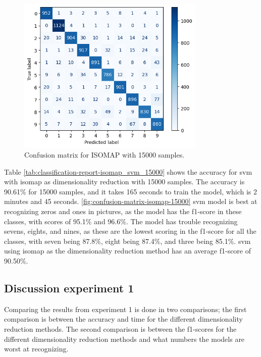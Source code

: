 \begin{figure}[htb!]
    \centering
    \includegraphics[width=0.8\textwidth]{figures/1-experiment/confusion_matrix_isomap_svm_15000.png}
    \caption{Confusion matrix for ISOMAP with 15000 samples.}
    \label{fig:confusion-matrix-isomap-15000}
\end{figure}


Table \ref{tab:classification-report-isomap_svm_15000} shows the accuracy for \gls{svm} with \gls{isomap} as dimensionality reduction with 15000 samples. The accuracy is 90.61\% for 15000 samples, and it takes 165 seconds to train the model, which is 2 minutes and 45 seconds. \autoref{fig:confusion-matrix-isomap-15000} \gls{svm} model is best at recognizing zeros and ones in pictures, as the model has the f1-score in these classes, with scores of 95.1\% and 96.6\%. The model has trouble recognizing sevens, eights, and nines, as these are the lowest scoring in the f1-score for all the classes, with seven being 87.8\%, eight being 87.4\%, and three being 85.1\%. \gls{svm} using \gls{isomap} as the dimensionality reduction method has an average f1-score of 90.50\%.

\subsection{Discussion experiment 1}\label{sec:discussion-experiment-1}
Comparing the results from experiment 1 is done in two comparisons; the first comparison is between the accuracy and time for the different dimensionality reduction methods. The second comparison is between the f1-scores for the different dimensionality reduction methods and what numbers the models are worst at recognizing.

